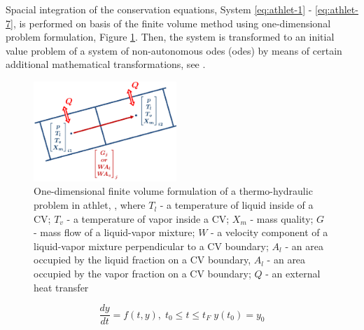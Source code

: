 Spacial integration of the conservation equations, System \ref{eq:athlet-1} - \ref{eq:athlet-7}, is performed on basis of the finite volume method using one-dimensional problem formulation, Figure \ref{fig:introduction-1d-fvm}. Then, the system is transformed to an initial value problem of a system of non-autonomous \acrlong{ode}s (\acrshort{ode}s) by means of certain additional mathematical transformations, see \cite{lt:ATHLMaM}.\\


\begin{figure}[!h]
  \centering
  \includegraphics[width=0.48\textwidth]{figures/introduction-1d-fvm.png}
\caption[One-dimensional finite volume formulation of a thermo-hydraulic problem in \acrshort{athlet}]{One-dimensional finite volume formulation of a thermo-hydraulic problem in \acrshort{athlet}, \cite{tims-presentation}, where $T_l$ - a temperature of liquid inside of a CV; $T_v$ - a temperature of vapor inside a CV; $X_m$ - mass quality; $G$ - mass flow of a liquid-vapor mixture; $W$ - a velocity component of a liquid-vapor mixture perpendicular to a CV boundary; $A_l$ - an area occupied by the liquid fraction on a CV boundary, $A_l$ - an area occupied by the vapor fraction on a CV boundary; $Q$ - an external heat transfer}
\label{fig:introduction-1d-fvm}
\end{figure}






\begin{equation} \label{eq:athlet-8}
	\frac{dy}{dt} = f(t,y), \;  t_{0} \leq t \leq t_{F} \; y(t_{0}) = y_{0}
\end{equation}

